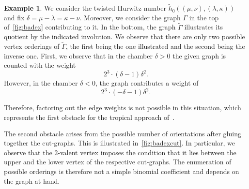 \documentclass[10pt]{amsart}
\theoremstyle{plain}
\theoremstyle{definition}
\theoremstyle{definition}
\newtheorem{exam}[exam]{Example}
\theoremstyle{plain}
\theoremstyle{plain}
\theoremstyle{remark}
\theoremstyle{plain}
\theoremstyle{plain}
\begin{document}
\begin{exam}
We consider the twisted Hurwitz number $\tilde{h}_0((\mu,\nu),(\lambda,\kappa))$ and fix $\delta=\mu-\lambda=\kappa-\nu$. Moreover, we consider the graph $\Gamma$ in the top of~\cref{fig:badex} contributing to it. In the bottom, the graph $\tilde{\Gamma}$ illustrates its quotient by the indicated involution. We observe that there are only two possible vertex orderings of $\tilde{\Gamma}$, the first being the one illustrated and the second being the inverse one. First, we observe that in the chamber $\delta>0$ the given graph is counted with the weight
\begin{equation*}
    2^3\cdot (\delta-1)\delta^2.
\end{equation*}
However, in the chamber $\delta<0$, the graph contributes a weight of
\begin{equation*}
        2^3\cdot (-\delta-1)\delta^2.
\end{equation*}

Therefore, factoring out the edge weights is not possible in this situation, which represents the first obstacle for the tropical approach of~\cite{CJM11}.

The second obstacle arises from the possible number of orientations after gluing together the cut-graphs. This is illustrated in~\cref{fig:badexcut}. In particular, we observe that the $2$-valent vertex imposes the condition that it lies between the upper and the lower vertex of the respective cut-graphs. The enumeration of possible orderings is therefore not a simple binomial coefficient and depends on the graph at hand.
\end{exam}
\end{document}
